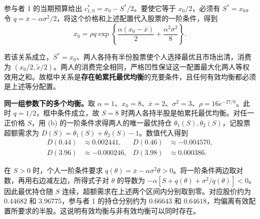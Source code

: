 \begin{solution}[blank-type=manual,blank-vsep=10\baselineskip]
\begin{enumerate}[label=(\alph*)]
参与者 1 的当期预算给出 $c_{1,0}^*=x_0-S^*/2$。要使它等于 $x_0/2$，必须有 $S^*=x_0$。令 $q=\bar x-\alpha\sigma^2/2$，将这个价格和上述配置代入股票的一阶条件，得到
\[
 \boxed{x_0=\rho q\exp\left\{
 \frac{\alpha(x_0-\bar x)}2+\frac{\alpha^2\sigma^2}{8}\right\}}.
\]

若该关系成立，$S^*=x_0$、两人各持有半份股票使个人选择最优且市场出清，消费为 $(x_0/2,\widetilde x/2)$。两人的消费完全相同，严格凹性保证这一配置最大化两人等权效用之和。故框中关系是\textbf{存在帕累托最优均衡}的充要条件，且任何有效均衡都必须是上述等分配置。

\textbf{同一组参数下的多个均衡。}取 $\alpha=1$、$x_0=8$、$\bar x=2$、$\sigma^2=3$、$\rho=16e^{-27/8}$。此时 $q=1/2$，框中条件成立，故 $S=8$ 时两人各持半股是帕累托最优均衡。对任一正价格 $S$，用 (b) 的一阶条件求得两人的唯一最优持仓 $\theta_1(S),\theta_2(S)$，记股票超额需求为 $D(S)=\theta_1(S)+\theta_2(S)-1$。数值代入得到
\[
 \begin{aligned}
 D(0.44)&\approx 0.002441, & D(0.46)&\approx -0.004570,\\
 D(3.96)&\approx -0.000246, & D(3.98)&\approx 0.000386.
 \end{aligned}
\]

在 $S>0$ 时，个人一阶条件要求 $q(\theta)=\bar x-\alpha\sigma^2\theta>0$。将一阶条件两边取对数，再用右边减左边，所得式子对 $\theta$ 的导数为 $-\alpha[S+q(\theta)+\sigma^2/q(\theta)]<0$。因此最优持仓随 $S$ 连续，超额需求在上述两个区间内分别取到零。对应股价约为 $0.44682$ 和 $3.96775$，参与者 1 的持仓分别约为 $0.66643$ 和 $0.64618$，均偏离有效配置所要求的半股。这说明有效均衡与非有效均衡可以同时存在。
\end{enumerate}
\end{solution}

